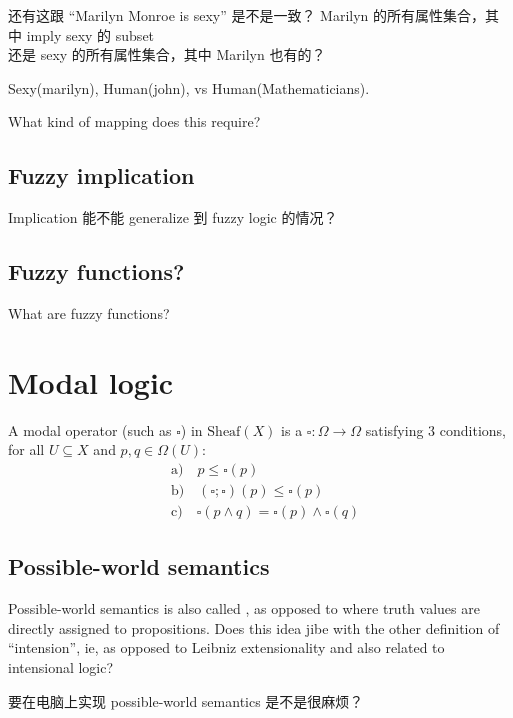 还有这跟 ``Marilyn Monroe is sexy'' 是不是一致？
Marilyn 的所有属性集合，其中 imply sexy 的 subset \\
还是 sexy 的所有属性集合，其中 Marilyn 也有的？

Sexy(marilyn), Human(john), vs Human(Mathematicians).


What kind of mapping does this require?

\subsection{Fuzzy implication}

Implication 能不能 generalize 到 fuzzy logic 的情况？

\subsection{Fuzzy functions?}

What are fuzzy functions?

\section{Modal logic}

A modal operator (such as $\square$) in $\mathrm{Sheaf}(X)$ is a  $\square: \Omega \rightarrow \Omega$ satisfying 3 conditions, for all $U \subseteq X$ and $p, q \in \Omega(U)$:
\begin{equation}
\begin{aligned}
& \mbox{a)} \quad p \le \square (p) \\
& \mbox{b)} \quad (\square ; \square) (p) \le \square (p) \\
& \mbox{c)} \quad \square (p \wedge q) = \square (p) \wedge \square (q)
\end{aligned}
\end{equation}

\subsection{Possible-world semantics}

Possible-world semantics is also called , as opposed to  where truth values are directly assigned to propositions.  Does this idea jibe with the other definition of ``intension'', ie, as opposed to Leibniz extensionality and also related to intensional logic?

要在电脑上实现 possible-world semantics 是不是很麻烦？

